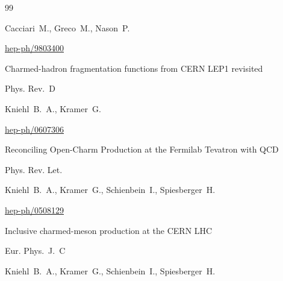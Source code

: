 \begin{thebibliography}{99}




\by Cacciari~M., Greco~M., Nason~P.


\arxiv  \href{http://arxiv.org/abs/hep-ph/9803400}{hep-ph/9803400}






\paper Charmed-hadron fragmentation functions from CERN LEP1 revisited


\jour Phys. Rev.~D 



\by Kniehl~B.~A., Kramer~G.



\arxiv \href{http://arxiv.org/abs/hep-ph/0607306}{hep-ph/0607306}






\paper Reconciling Open-Charm Production at the Fermilab Tevatron with QCD


\jour Phys. Rev. Let. 



\by  Kniehl~B.~A., Kramer~G., Schienbein~I., Spiesberger~H.



\arxiv \href{http://arxiv.org/abs/hep-ph/0508129}{hep-ph/0508129}






\paper Inclusive charmed-meson production at the CERN LHC


\paper \jour Eur. Phys.~J.~C 



\by  Kniehl~B.~A.,  Kramer~G.,  Schienbein~I.,  Spiesberger~H.


\end{thebibliography}

